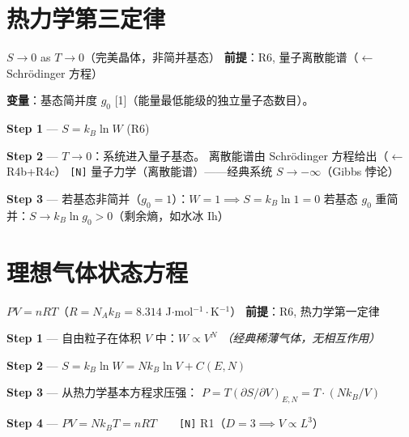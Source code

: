 \section{热力学第三定律}
\label{sec:third-law}

\begin{lawbox}[热力学第三定律]
  $S \to 0$ as $T \to 0$（完美晶体，非简并基态）
  \quad\textbf{前提}：R6, 量子离散能谱（$\leftarrow$ Schr\"{o}dinger 方程）
\end{lawbox}

\noindent\textbf{变量}：基态简并度 $g_0$ [1]（能量最低能级的独立量子态数目）。

\begin{derivationbox}[推导]
  \textbf{Step 1} — $S = k_B \ln W$ (R6)

  \textbf{Step 2} — $T \to 0$：系统进入量子基态。
  离散能谱由 Schr\"{o}dinger 方程给出（$\leftarrow$ R4b+R4c）
  \hfill\texttt{[N]} 量子力学（离散能谱）——经典系统 $S \to -\infty$（Gibbs 悖论）

  \textbf{Step 3} — 若基态非简并（$g_0=1$）：$W=1 \implies S = k_B\ln 1 = 0$
  若基态 $g_0$ 重简并：$S \to k_B\ln g_0 > 0$（剩余熵，如水冰 Ih）
\end{derivationbox}

\section{理想气体状态方程}

\begin{lawbox}[理想气体状态方程]
  $PV = nRT$（$R = N_A k_B = 8.314$ J$\cdot$mol$^{-1}\cdot$K$^{-1}$）
  \quad\textbf{前提}：R6, 热力学第一定律
\end{lawbox}

\begin{derivationbox}[推导]
  \textbf{Step 1} — 自由粒子在体积 $V$ 中：$W \propto V^N$
  \hfill\textit{（经典稀薄气体，无相互作用）}

  \textbf{Step 2} — $S = k_B\ln W = Nk_B\ln V + C(E,N)$

  \textbf{Step 3} — 从热力学基本方程求压强：
  $P = T(\partial S/\partial V)_{E,N} = T\cdot(Nk_B/V)$

  \textbf{Step 4} — $PV = Nk_B T = nRT\qquad$\texttt{[N]} R1（$D=3 \implies V \propto L^3$）
\end{derivationbox}

